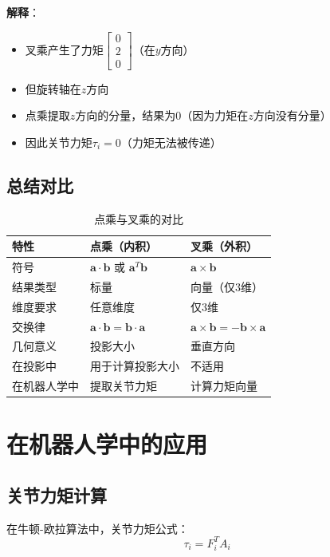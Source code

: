 \documentclass[12pt,a4paper]{article}
\begin{document}
\textbf{解释}：
\begin{itemize}
\item 叉乘产生了力矩$\begin{bmatrix} 0 \\ 2 \\ 0 \end{bmatrix}$（在$y$方向）
\item 但旋转轴在$z$方向
\item 点乘提取$z$方向的分量，结果为$0$（因为力矩在$z$方向没有分量）
\item 因此关节力矩$\tau_i = 0$（力矩无法被传递）
\end{itemize}

\subsection{总结对比}

\begin{table}[h]
\centering
\begin{tabular}{|l|l|l|}
\hline
\textbf{特性} & \textbf{点乘（内积）} & \textbf{叉乘（外积）} \\
\hline
符号 & $\bm{a} \cdot \bm{b}$ 或 $\bm{a}^T \bm{b}$ & $\bm{a} \times \bm{b}$ \\
\hline
结果类型 & 标量 & 向量（仅3维） \\
\hline
维度要求 & 任意维度 & 仅3维 \\
\hline
交换律 & $\bm{a} \cdot \bm{b} = \bm{b} \cdot \bm{a}$ & $\bm{a} \times \bm{b} = -\bm{b} \times \bm{a}$ \\
\hline
几何意义 & 投影大小 & 垂直方向 \\
\hline
在投影中 & 用于计算投影大小 & 不适用 \\
\hline
在机器人学中 & 提取关节力矩 & 计算力矩向量 \\
\hline
\end{tabular}
\caption{点乘与叉乘的对比}
\label{tab:dot_vs_cross}
\end{table}

\section{在机器人学中的应用}

\subsection{关节力矩计算}

在牛顿-欧拉算法中，关节力矩公式：
\begin{equation}
\tau_i = F_i^T A_i
\end{equation}
\end{document}

